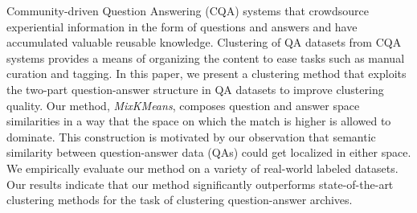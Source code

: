Community-driven Question Answering (CQA) systems that crowdsource experiential information in the form of questions and answers and have accumulated valuable reusable knowledge. Clustering of QA datasets from CQA systems provides a means of organizing the content to ease tasks such as manual curation and tagging. In this paper, we present a clustering method that exploits the two-part question-answer structure in QA datasets to improve clustering quality. Our method, {\it MixKMeans}, composes question and answer space similarities in a way that the space on which the match is higher is allowed to dominate. This construction is motivated by our observation that semantic similarity between question-answer data (QAs) could get localized in either space. We empirically evaluate our method on a variety of real-world labeled datasets. Our results indicate that our method significantly outperforms state-of-the-art clustering methods for the task of clustering question-answer archives.
